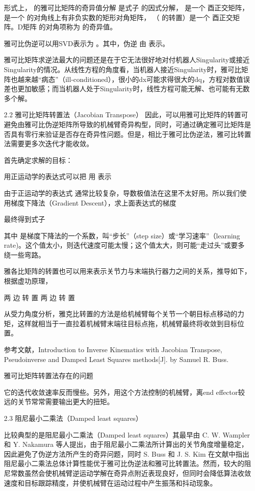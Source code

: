 形式上，
的雅可比矩阵的奇异值分解
是式子
的因式分解，
是一个
酉正交矩阵，
是一个
的对角线上有非负实数的矩形对角矩阵，
（
的转置）是一个
酉正交矩阵。D矩阵
的对角项称为
的奇异值。

雅可比伪逆可以用SVD表示为
。其中，伪逆
由
表示。

雅可比矩阵求逆法最大的问题还是在于它无法很好地对付机器人Singularity或接近Singularity的情况。从线性方程的角度看，当机器人接近Singularity时，雅可比矩阵也越来越“病态”（ill-conditioned），很小的dx可能求得很大的dq，方程对数值误差也更加敏感；而当机器人处于Singularity时，线性方程可能无解、也可能有无数多个解。

2.2 雅可比矩阵转置法（Jacobian Transpose）
因此，可以用雅可比矩阵的转置可避免由雅可比伪逆矩阵所导致的机械臂奇异构型，同时，可通过确定雅可比矩阵是否具有零行来验证是否存在奇异性问题。但是，相比于雅可比伪逆法，雅可比转置法需要更多次迭代才能收敛。

首先确定求解的目标：

用正运动学的表达式可以把 
 用 
 表示

由于正运动学的表达式 
 通常比较复杂，导数极值法在这里不太好用。所以我们使用梯度下降法（Gradient Descent），求上面表达式的梯度

最终得到式子


其中 
 是梯度下降法的一个系数，叫“步长”（step size）或“学习速率”（learning rate)。这个值太小，则迭代速度可能太慢；这个值太大，则可能“走过头”或要多绕一些弯路。





雅各比矩阵的转置也可以用来表示关节力与末端执行器力之间的关系，推导如下，根据虚功原理，

两
边
转
置
两
边
转
置

从受力角度分析，雅克比转置的方法是给机械臂每个关节一个朝目标点移动的力矩，这样就相当于一直拉着机械臂末端往目标点拖，机械臂最终将收敛到目标位置。

参考文献，Introduction to Inverse Kinematics with Jacobian Transpose, Pseudoinverse and Damped Least Squares methods[J]. by Samuel R. Buss.


雅可比矩阵转置法存在的问题

它的迭代收敛速率反而慢些。另外，用这个方法控制的机械臂，离end effector较远的关节常常需要输出更大的扭矩。



2.3 阻尼最小二乘法（Damped least squares）


比较典型的是阻尼最小二乘法（Damped least squares）其最早由 C. W. Wampler 和 Y. Nakamura 等人提出，由于阻尼最小二乘法所计算出的关节角度增量稳定，因此避免了伪逆方法所产生的奇异问题，同时 S. Buss 和 J. S. Kim 在文献中指出阻尼最小二乘法总体计算性能优于雅可比伪逆法和雅可比转置法。然而，较大的阻尼常数虽然会使机械臂逆运动学解在奇异点附近表现良好，但同时会降低算法收敛速度和目标跟踪精度，并使机械臂在运动过程中产生振荡和抖动现象。



